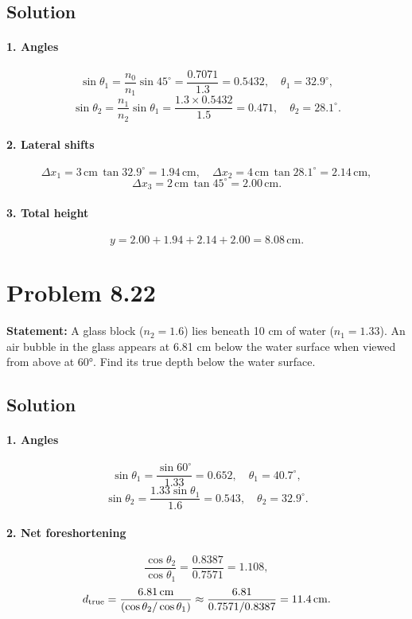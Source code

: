 \subsection*{Solution}
\paragraph{1. Angles}
\[
\sin\theta_1 = \frac{n_0}{n_1}\sin45^\circ = \frac{0.7071}{1.3} = 0.5432,\quad \theta_1 = 32.9^\circ,
\]
\[
\sin\theta_2 = \frac{n_1}{n_2}\sin\theta_1 = \frac{1.3\times0.5432}{1.5} = 0.471,\quad \theta_2 = 28.1^\circ.
\]

\paragraph{2. Lateral shifts}
\[
\Delta x_1 = 3\,\mathrm{cm}\,\tan32.9^\circ = 1.94\,\mathrm{cm},
\quad
\Delta x_2 = 4\,\mathrm{cm}\,\tan28.1^\circ = 2.14\,\mathrm{cm},
\]
\[
\Delta x_3 = 2\,\mathrm{cm}\,\tan45^\circ = 2.00\,\mathrm{cm}.
\]

\paragraph{3. Total height}
\[
y = 2.00 + 1.94 + 2.14 + 2.00 = 8.08\,\mathrm{cm}.
\]

\section*{Problem 8.22}
\textbf{Statement:} A glass block ($n_2=1.6$) lies beneath 10 cm of water ($n_1=1.33$). An air bubble in the glass appears at 6.81 cm below the water surface when viewed from above at 60°. Find its true depth below the water surface.

\subsection*{Solution}
\paragraph{1. Angles}
\[
\sin\theta_1 = \frac{\sin60^\circ}{1.33} = 0.652,\quad \theta_1 = 40.7^\circ,
\]
\[
\sin\theta_2 = \frac{1.33\sin\theta_1}{1.6} = 0.543,\quad \theta_2 = 32.9^\circ.
\]
\paragraph{2. Net foreshortening}
\[
\frac{\cos\theta_2}{\cos\theta_1}
= \frac{0.8387}{0.7571} = 1.108,
\]
\[
d_{\rm true}
= \frac{6.81\,\mathrm{cm}}{(\cos\theta_2/\cos\theta_1)} 
\approx \frac{6.81}{0.7571/0.8387}
= 11.4\,\mathrm{cm}.
\]

